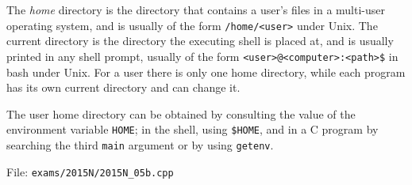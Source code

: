 \documentclass{sope}
\begin{document}
The \emph{home} directory is the directory that contains a user's files in a multi-user operating system, and is usually of the form \texttt{/home/<user>} under Unix. The current directory is the directory the executing shell is placed at, and is usually printed in any shell prompt, usually of the form \texttt{<user>@<computer>:<path>\$} in bash under Unix. For a user there is only one home directory, while each program has its own current directory and can change it.

The user home directory can be obtained by consulting the value of the environment variable \texttt{HOME}; in the shell, using \texttt{\$HOME}, and in a C program by searching the third \texttt{main} argument or by using \texttt{getenv}.


File: \texttt{exams/2015N/2015N\_05b.cpp}





\end{document}
